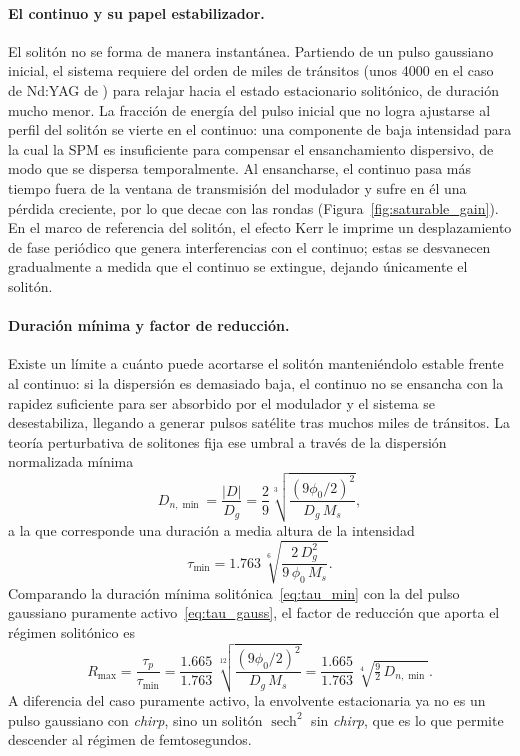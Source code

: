 \paragraph{El continuo y su papel estabilizador.}
El solitón no se forma de manera instantánea. Partiendo de un pulso gaussiano
inicial, el sistema requiere del orden de miles de tránsitos (unos 4000 en el caso
de Nd:YAG de \cite[Fig.~6.17]{Keller2022}) para relajar
hacia el estado estacionario solitónico, de duración mucho menor. La fracción de
energía del pulso inicial que no logra ajustarse al perfil del solitón se vierte
en el continuo: una componente de baja intensidad para la cual la SPM es
insuficiente para compensar el ensanchamiento dispersivo, de modo que se dispersa
temporalmente. Al ensancharse, el continuo pasa más tiempo fuera de la ventana de
transmisión del modulador y sufre en él una pérdida creciente, por lo que decae
con las rondas (Figura~\ref{fig:saturable_gain}). En el marco de referencia del
solitón, el efecto Kerr le imprime un desplazamiento de fase periódico que genera
interferencias con el continuo; estas se desvanecen gradualmente a medida que el
continuo se extingue, dejando únicamente el solitón.



\paragraph{Duración mínima y factor de reducción.}
Existe un límite a cuánto puede acortarse el solitón manteniéndolo estable frente
al continuo: si la dispersión es demasiado baja, el continuo no se ensancha con la
rapidez suficiente para ser absorbido por el modulador y el sistema se
desestabiliza, llegando a generar pulsos satélite tras muchos miles de tránsitos.
La teoría perturbativa de solitones fija ese umbral a través de la dispersión
normalizada mínima
%
\begin{equation}
    D_{n,\min} = \frac{|D|}{D_g}
    = \frac{2}{9}\sqrt[3]{\frac{(9\phi_0/2)^2}{D_g\,M_s}},
    \label{eq:disp_min}
\end{equation}
%
a la que corresponde una duración a media altura de la intensidad
%
\begin{equation}
    \tau_{\min} = 1.763\,\sqrt[6]{\frac{2\,D_g^{2}}{9\,\phi_0\,M_s}}.
    \label{eq:tau_min}
\end{equation}
%
Comparando la duración mínima solitónica~\eqref{eq:tau_min} con la del pulso
gaussiano puramente activo~\eqref{eq:tau_gauss}, el factor de reducción que aporta
el régimen solitónico es
%
\begin{equation}
    R_{\max} = \frac{\tau_p}{\tau_{\min}}
    = \frac{1.665}{1.763}\,\sqrt[12]{\frac{(9\phi_0/2)^2}{D_g\,M_s}}
    = \frac{1.665}{1.763}\,\sqrt[4]{\tfrac{9}{2}\,D_{n,\min}}.
    \label{eq:factor_reduccion}
\end{equation}
%
A diferencia del caso puramente activo, la envolvente estacionaria ya no es un
pulso gaussiano con \emph{chirp}, sino un solitón $\operatorname{sech}^2$ sin
\emph{chirp}, que es lo que permite descender al régimen de femtosegundos.

